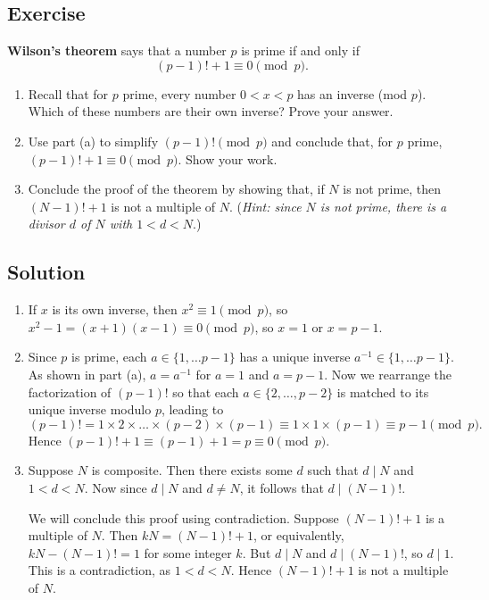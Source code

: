\documentclass{article}
\newcounter{counter}
\newcommand{\Exercise}{Exercise \stepcounter{counter}\thecounter}
\begin{document}
\subsection*{\Exercise}
    \textbf{Wilson's theorem} says that a number $p$ is prime if and only if $$(p - 1)! + 1 \equiv 0 \pmod{p}.$$
    \begin{enumerate}
        \item Recall that for $p$ prime, every number $0 < x < p$ has an inverse (mod $p$). Which of these numbers are their own inverse? Prove your answer.
        \item Use part (a) to simplify $(p - 1)! \pmod{p}$ and conclude that, for $p$ prime, $(p - 1)! + 1 \equiv 0 \pmod{p}$. Show your work.
        \item Conclude the proof of the theorem by showing that, if $N$ is not prime, then $(N - 1)! + 1$ is not a multiple of $N$. (\textit{Hint: since $N$ is not prime, there is a divisor $d$ of $N$ with $1 < d < N$}.)
    \end{enumerate}

\subsection*{Solution}
    \begin{enumerate}
        \item If $x$ is its own inverse, then $x^{2} \equiv 1 \pmod{p}$, so $x^{2} - 1 = (x + 1)(x - 1) \equiv 0 \pmod{p}$, so $x = 1$ or $x = p - 1$.
        \item Since $p$ is prime, each $a \in \{1, \dots p - 1\}$ has a unique inverse $a^{-1} \in \{1, \dots p - 1\}$. As shown in part (a), $a = a^{-1}$ for $a = 1$ and $a = p - 1$. Now we rearrange the factorization of $(p - 1)!$ so that each $a \in \{2, \dots, p - 2\}$ is matched to its unique inverse modulo $p$, leading to
        $$(p - 1)! = 1 \times 2 \times \dots \times (p - 2) \times (p - 1) \equiv 1 \times 1 \times (p - 1) \equiv p - 1 \pmod{p}.$$ Hence $(p - 1)! + 1 \equiv (p - 1) + 1 = p \equiv 0 \pmod{p}$.
        \item Suppose $N$ is composite. Then there exists some $d$ such that $d \mid N$ and $1 < d < N$. Now since $d \mid N$ and $d \ne N$, it follows that $d \mid (N - 1)!$. 
        
        \vspace{1.5mm}
        We will conclude this proof using contradiction. Suppose $(N - 1)! + 1$ is a multiple of $N$. Then $kN = (N - 1)! + 1$, or equivalently, $kN - (N - 1)! = 1$ for some integer $k$. But $d \mid N$ and $d \mid (N - 1)!$, so $d \mid 1$. This is a contradiction, as $1 < d < N$. Hence $(N - 1)! + 1$ is not a multiple of $N$.
    \end{enumerate}
\end{document}
